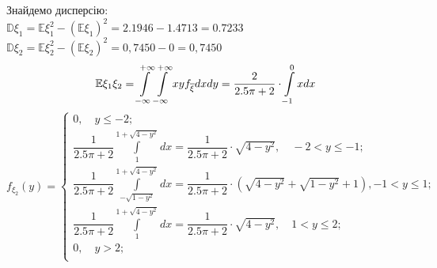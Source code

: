 \documentclass[14pt,a4paper]{scrartcl}
\theoremstyle{definition}
\theoremstyle{remark}
\theoremstyle{definition}
\theoremstyle{definition}
\begin{document}
Знайдемо дисперсію:\\
$
\mathbb{D}\xi_1 = \mathbb{E}\xi_1^2 - \left( \mathbb{E}\xi_1 \right)^2 = 2.1946 - 1.4713 = 0.7233
$\\
$
\mathbb{D}\xi_2 = \mathbb{E}\xi_2^2 - \left( \mathbb{E}\xi_2 \right)^2 = 0,7450 - 0 = 0,7450
$
$$
\mathbb{E} \xi_1 \xi_2 =  \int\limits_{-\infty}^{+\infty}\int\limits_{-\infty}^{+\infty}{ xy f_{\overline{\xi}} dxdy} = \frac{2}{2.5\pi + 2}\cdot \int\limits_{-1}^{0}{xdx}
$$
$$
f_{\xi_2} (y) = \begin{cases}
	0, \quad y \leq  -2;\\
	\dfrac{1}{2.5\pi + 2}  \int\limits_{1}^{ 1+ \sqrt{4 - y^2}}{dx} = \dfrac{1}{2.5\pi + 2} \cdot \sqrt{4 - y^2}, \quad -2 < y \leq -1;\\
	\dfrac{1}{2.5\pi + 2}   \int\limits_{- \sqrt{1-y^2}}^{1+ \sqrt{4 - y^2}}{dx}
	=  \dfrac{1}{2.5\pi + 2} \cdot \left( \sqrt{4 - y^2} + \sqrt{1-y^2}+ 1  \right),  -1 < y \leq 1; \\
		\dfrac{1}{2.5\pi + 2}  \int\limits_{1}^{ 1+ \sqrt{4 - y^2}}{dx} = \dfrac{1}{2.5\pi + 2} \cdot \sqrt{4 - y^2}, \quad 1 < y \leq 2;\\
			0, \quad y >  2;\\
\end{cases}
$$
\end{document}
